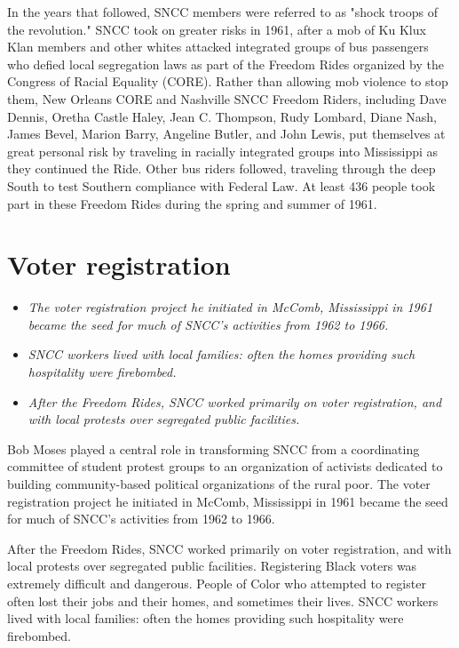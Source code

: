 In the years that followed, SNCC members were referred to as "shock
troops of the revolution." SNCC took on greater risks in 1961, after a
mob of Ku Klux Klan members and other whites attacked integrated groups
of bus passengers who defied local segregation laws as part of the
Freedom Rides organized by the Congress of Racial Equality (CORE).
Rather than allowing mob violence to stop them, New Orleans CORE and
Nashville SNCC Freedom Riders, including Dave Dennis, Oretha Castle
Haley, Jean C. Thompson, Rudy Lombard, Diane Nash, James Bevel, Marion
Barry, Angeline Butler, and John Lewis, put themselves at great personal
risk by traveling in racially integrated groups into Mississippi as they
continued the Ride. Other bus riders followed, traveling through the
deep South to test Southern compliance with Federal Law. At least 436
people took part in these Freedom Rides during the spring and summer of
1961.

\section{Voter registration}\label{voter-registration}

\begin{itemize}
\item
  \emph{The voter registration project he initiated in McComb,
  Mississippi in 1961 became the seed for much of SNCC's activities from
  1962 to 1966.}
\item
  \emph{SNCC workers lived with local families: often the homes
  providing such hospitality were firebombed.}
\item
  \emph{After the Freedom Rides, SNCC worked primarily on voter
  registration, and with local protests over segregated public
  facilities.}
\end{itemize}

Bob Moses played a central role in transforming SNCC from a coordinating
committee of student protest groups to an organization of activists
dedicated to building community-based political organizations of the
rural poor. The voter registration project he initiated in McComb,
Mississippi in 1961 became the seed for much of SNCC's activities from
1962 to 1966.

After the Freedom Rides, SNCC worked primarily on voter registration,
and with local protests over segregated public facilities. Registering
Black voters was extremely difficult and dangerous. People of Color who
attempted to register often lost their jobs and their homes, and
sometimes their lives. SNCC workers lived with local families: often the
homes providing such hospitality were firebombed.

